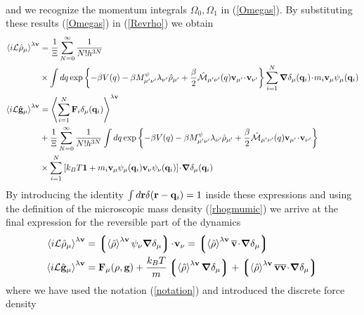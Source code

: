 \documentclass[b5paper,openright,11pt]{book}
\newcommand{\esc}{\!\cdot\!}
\newcommand{\llangle}{\left\langle}
\newcommand{\rrangle}{\right\rangle}
\newcommand{\llg}{\left\lgroup}
\newcommand{\rlg}{\right\rgroup}
\begin{document}
\begin{appendices}
\begin{align}
\label{Revrho}
\end{align}
and  we  recognize  the   momentum  integrals  $\Omega_0,\Omega_1$  in
(\ref{Omegas}).   By  substituting  these  results  (\ref{Omegas})  in
(\ref{Revrho}) we obtain
\begin{align}
  \llangle i{\cal L}\hat{\rho}_\mu\rrangle^{\lambda{\bf v}} &= 
\frac{1}{\Xi} \sum_{N=0}^\infty \frac{1}{N!h^{3N}} \nonumber \\
&\times \int dq  
\exp\left\{-\beta V(q)-\beta M^\psi_{\mu' \nu'}\lambda_{\nu'}\hat{\rho}_{\mu'}
+\frac{\beta}{2}\hat{\cal M}_{\mu'\nu'}(q){\bf v}_{\mu'} \esc{\bf v}_{\nu'}\right\}\sum_{i=1}^N\boldsymbol{\nabla}\delta_\mu({\bf q}_i)\esc m_i{\bf v}_\mu\psi_\mu({\bf q}_i)
\nonumber\\
  \llangle i{\cal L}\hat{\bf g}_\mu\rrangle^{\lambda{\bf v}} &=
  \llangle \sum_{i=1}^N{\bf F}_i\delta_\mu({\bf q}_i)\rrangle^{\lambda{\bf v}}
\nonumber \\
  &+\frac{1}{\Xi} \sum_{N=0}^\infty \frac{1}{N!h^{3N}}\int dq 
\exp\left\{-\beta V(q)-\beta M^\psi_{\mu'\nu'}\lambda_{\nu'}\hat{\rho}_{\mu'}+\frac{\beta}{2}\hat{\cal M}_{\mu'\nu'}(q){\bf v}_{\mu'} \esc{\bf v}_{\nu'}\right\}
\nonumber\\
&\times \sum_{i=1}^N\left[k_BT{\bf 1} 
+ 
m_i{\bf v}_\mu\psi_{\mu}({\bf q}_i)
{\bf v}_\nu\psi_{\nu}({\bf q}_i)\right]
\esc\boldsymbol{\nabla}\delta_\mu({\bf q}_i)
\label{Revrho3}
\end{align}
By introducing the identity $\int d{\bf r}\delta({\bf r}-{\bf q}_i)=1$
inside these expressions  and using the definition  of the microscopic
mass density (\ref{rhogmumic}) we arrive at the final expression for
the reversible part of the dynamics
\begin{align}
  \llangle i{\cal L}\hat{\rho}_\mu\rrangle^{\lambda{\bf v}} &=   \llg\llangle \hat{\rho}\rrangle^{\lambda{\bf v}}\psi_\nu\boldsymbol{\nabla}\delta_\mu \rlg\esc  {\bf v}_\nu
=  \llg\llangle \hat{\rho}\rrangle^{\lambda{\bf v}}\overline{\bf v}\esc  \boldsymbol{\nabla}\delta_\mu \rlg
\nonumber\\
  \llangle i{\cal L}\hat{\bf g}_\mu\rrangle^{\lambda{\bf v}} &={\bf F}_\mu(\rho,{\bf g})
+ \frac{k_BT}{m} \llg \llangle\hat{\rho}\rrangle^{\lambda{\bf v}}\boldsymbol{\nabla}\delta_\mu\rlg
+\llg\llangle \hat{\rho}\rrangle^{\lambda{\bf v}}\overline{\bf v}\overline{\bf v}\esc
\boldsymbol{\nabla}\delta_{\mu}\rlg 
\end{align}
where we have used the notation (\ref{notation}) and introduced the discrete force density 
\begin{align}

\end{align}
\end{appendices}
\end{document}
